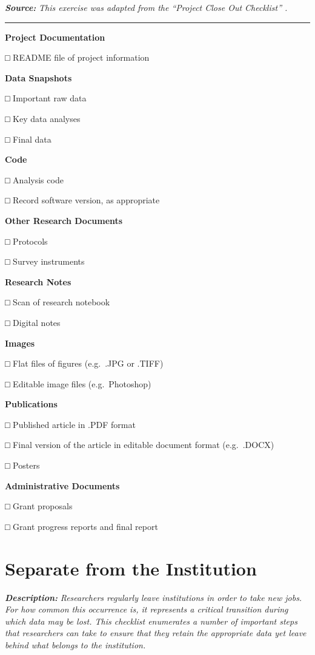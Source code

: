 \documentclass[
]{book}
\begin{document}
\textbf{\emph{Source:}} \emph{This exercise was adapted from the ``Project Close Out Checklist'' \citep{briney_project_2020}.}

\begin{center}\rule{0.5\linewidth}{0.5pt}\end{center}

\textbf{Project Documentation}

□ README file of project information

\textbf{Data Snapshots}

□ Important raw data

□ Key data analyses

□ Final data

\textbf{Code}

□ Analysis code

□ Record software version, as appropriate

\textbf{Other Research Documents}

□ Protocols

□ Survey instruments

\textbf{Research Notes}

□ Scan of research notebook

□ Digital notes

\textbf{Images}

□ Flat files of figures (e.g.~.JPG or .TIFF)

□ Editable image files (e.g.~Photoshop)

\textbf{Publications}

□ Published article in .PDF format

□ Final version of the article in editable document format (e.g.~.DOCX)

□ Posters

\textbf{Administrative Documents}

□ Grant proposals

□ Grant progress reports and final report

\hypertarget{separation}{%
\section{Separate from the Institution}\label{separation}}

\textbf{\emph{Description:}} \emph{Researchers regularly leave institutions in order to take new jobs. For how common this occurrence is, it represents a critical transition during which data may be lost. This checklist enumerates a number of important steps that researchers can take to ensure that they retain the appropriate data yet leave behind what belongs to the institution.}
\end{document}
